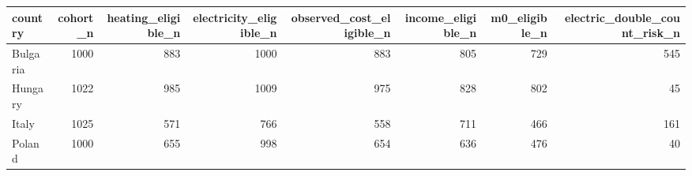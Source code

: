 \begin{tabular}{lrrrrrrr}
\toprule
country & cohort_n & heating_eligible_n & electricity_eligible_n & observed_cost_eligible_n & income_eligible_n & m0_eligible_n & electric_double_count_risk_n \\
\midrule
Bulgaria & 1000 & 883 & 1000 & 883 & 805 & 729 & 545 \\
Hungary & 1022 & 985 & 1009 & 975 & 828 & 802 & 45 \\
Italy & 1025 & 571 & 766 & 558 & 711 & 466 & 161 \\
Poland & 1000 & 655 & 998 & 654 & 636 & 476 & 40 \\
\bottomrule
\end{tabular}
